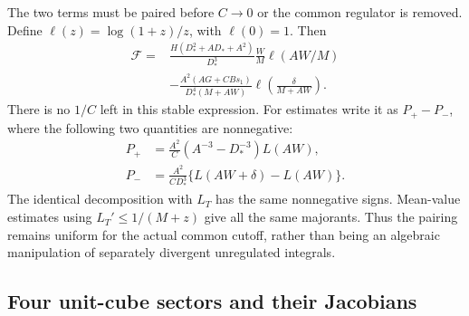 The two terms must be paired before $C\to0$ or the common regulator is
removed. Define $\ell(z)=\log(1+z)/z$, with $\ell(0)=1$. Then
\begin{align*}
 \mathcal F={}&
 \frac{H(D_*^2+AD_*+A^2)}{D_*^3}
       \frac WM\ell(AW/M)\\
 &-\frac{A^2(AG+CBs_1)}{D_*^4(M+AW)}
                       \ell\left(\frac\delta{M+AW}\right).
\end{align*}
There is no $1/C$ left in this stable expression. For estimates write it
as $P_+-P_-$, where the following two quantities are nonnegative:
\begin{align*}
 P_+&=\frac{A^2}{C}(A^{-3}-D_*^{-3})L(AW),\\
 P_-&=\frac{A^2}{CD_*^3}\{L(AW+\delta)-L(AW)\}.
\end{align*}
The identical decomposition with $L_T$ has the same nonnegative signs.
Mean-value estimates using $L_T'\le1/(M+z)$ give all the same majorants.
Thus the pairing remains uniform for the actual common cutoff, rather than
being an algebraic manipulation of separately divergent unregulated integrals.

\subsection{Four unit-cube sectors and their Jacobians}

